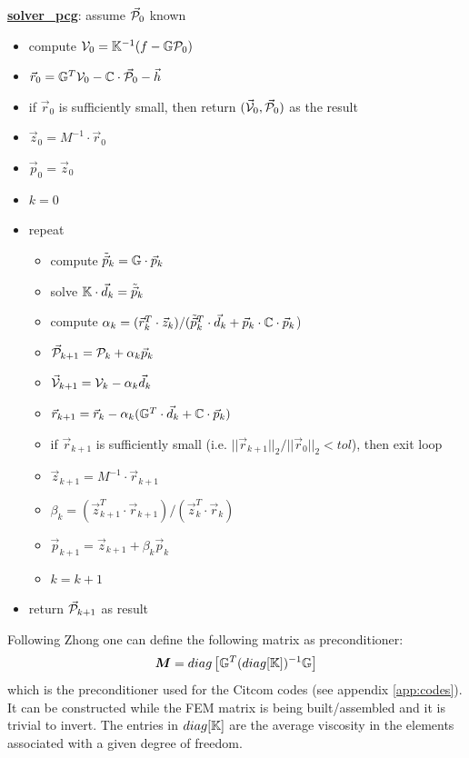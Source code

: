 \begin{mdframed}[backgroundcolor=blue!5]
\underline{\bf solver\_pcg}: assume $\vec{\cal P}_0$ known
\begin{itemize}
\item compute ${\cal V}_0={\mathbb{K}}^{-1}(f-{\mathbb{G}}{\cal P}_0)$
\item $\vec{r}_0 = {\mathbb{G}}^T {\cal V}_0 - {\mathbb{C}} \cdot \vec{\cal P}_0 - \vec{h}$
\item if $\vec{r}_0$ is sufficiently small, then return $(\vec{\cal V}_0,\vec{\cal P}_0)$ as the result
\item $\vec{z}_0= M^{-1} \cdot \vec{r}_0$ 
\item $\vec{p}_0=\vec{z}_0$
\item $k=0$
\item repeat
\begin{itemize}
\item compute $\tilde{\vec{p}}_k = {\mathbb{G}} \cdot \vec{p}_k$
\item solve ${\mathbb{K}}\cdot  \vec{d}_k = \tilde{\vec{p}}_k$
\item compute $\alpha_k=(\vec{r}_k^T \cdot \vec{z}_k)/(\tilde{\vec{p}}_k^T \cdot \vec{d}_k
      + \vec{p}_k\cdot{\mathbb{C}} \cdot \vec{p}_k$)
\item $\vec{\cal P}_{k+1} = {\cal P}_k+\alpha_k \vec{p}_k$
\item $\vec{\cal V}_{k+1} = {\cal V}_k - \alpha_k \vec{d}_k$
\item $\vec{r}_{k+1} = \vec{r}_k - \alpha_k ({\mathbb{G}}^T \cdot \vec{d}_k + {\mathbb{C}} \cdot \vec{p}_k) $
\item if $\vec{r}_{k+1}$ is sufficiently small (i.e. $||\vec{r}_{k+1}||_2/||\vec{r}_0||_2 <tol$), 
      then exit loop
\item $\vec{z}_{k+1}=M^{-1} \cdot \vec{r}_{k+1}$
\item $\beta_k=(\vec{z}_{k+1}^T \cdot  \vec{r}_{k+1})/(\vec{z}_k^T \cdot  \vec{r}_k)$
\item $\vec{p}_{k+1} =\vec{z}_{k+1}+ \beta_k \vec{p}_k$
\item $k=k+1$
\end{itemize}
\item return $\vec{\cal P}_{k+1}$ as result
\end{itemize}
\end{mdframed}

Following Zhong \etal \cite{zhym12} one can define the following matrix as preconditioner:
\[
{\bm M} = diag \left[ {\mathbb{G}}^T (diag [{\mathbb{K}}]  )^{-1} {\mathbb{G}} \right]
\]
which is the preconditioner used for the Citcom codes (see appendix \ref{app:codes}). It 
can be constructed while the FEM matrix is being built/assembled
and it is trivial to invert. The entries in
$diag[{\mathbb{K}}]$ are the average viscosity in the elements associated
with a given degree of freedom.

